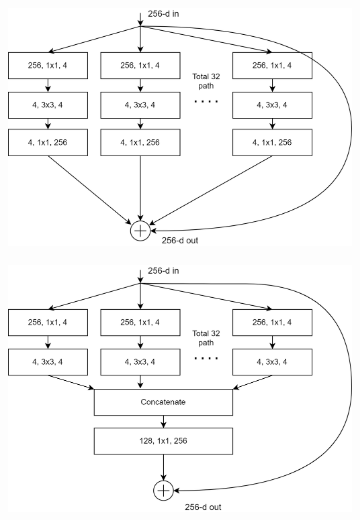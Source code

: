 \begin{figure}[h!]
    \centering %
    \begin{subfigure}{0.33\textwidth}
        \includegraphics[width=\linewidth]{Images/Chapter2/resnext1.png}
        \caption{}
        \label{fig:ch2-resnext1}
    \end{subfigure}\hfil %
    \begin{subfigure}{0.33\textwidth}
        \includegraphics[width=\linewidth]{Images/Chapter2/resnext2.png}
        \caption{}
        \label{fig:ch2-resnext2}
    \end{subfigure}\hfil %
    \begin{subfigure}{0.33\textwidth}

\end{subfigure}
\end{figure}
